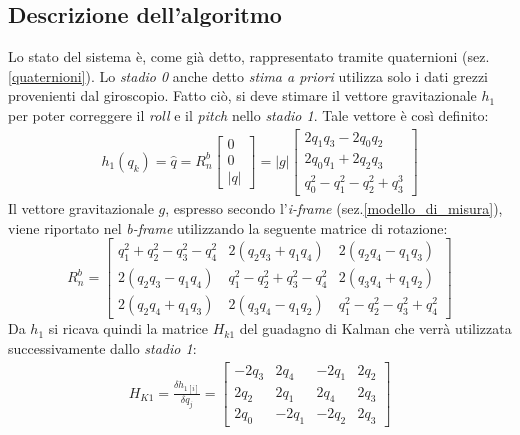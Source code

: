 \subsection{Descrizione dell'algoritmo}
Lo stato del sistema è, come già detto, rappresentato tramite quaternioni (sez.\ref{quaternioni}). Lo \textit{stadio 0} anche detto \textit{stima a priori} utilizza solo i dati grezzi provenienti dal giroscopio.
Fatto ciò, si deve stimare il vettore gravitazionale $h_1$ per poter correggere il \textit{roll} e il \textit{pitch} nello \textit{stadio 1}. Tale vettore è così definito:
\begin{eqnarray}
h_1(q_k)= \hat{q}= R_n^b \begin{bmatrix}
0  \\
0 \\
|q|
\end{bmatrix}= |g| \begin{bmatrix}
2q_1q_3 - 2q_0q_2  \\
2q_0q_1 + 2q_2q_3 \\
q_0^2 - q_1^2 - q_2^2 + q_3^3
\end{bmatrix}
\end{eqnarray}
Il vettore gravitazionale $g$, espresso secondo l'\textit{i-frame} (sez.\ref{modello_di_misura}), viene riportato nel \textit{b-frame} utilizzando la seguente matrice di rotazione:
\begin{equation}
R_n^b= \begin{bmatrix}
q_1^2 +  q_2^2 -  q_3^2 -  q_4^2 & 2(q_2 q_3 + q_1  q_4) & 2(q_2 q_4 - q_1 q_3) \\
2(q_2 q_3 - q_1 q_4)    &  q_1^2 - q_2^2 +  q_3^2 -  q_4^2  & 2(q_3 q_4 + q_1q_2)\\
2(q_2 q_4 + q_1 q_3)    & 2(q_3 q_4 - q_1 q_2)  &  q_1^2 -  q_2^2 - q_3^2 +  q_4^2
\end{bmatrix}
\end{equation}
Da $h_1$ si ricava quindi la matrice $H_{k1}$ del guadagno di Kalman che verrà utilizzata successivamente dallo \textit{stadio 1}:
\begin{eqnarray}
H_{K1}= \frac{\delta h_{1[i]}}{\delta q_j}=  \begin{bmatrix}
-2q_3 & 2q_4 & -2q_1 & 2q_2  \\
2q_2 & 2q_1 & 2q_4 & 2q_3\\
2q_0 & -2q_1 & -2q_2 & 2q_3
\end{bmatrix}
\end{eqnarray}  





























